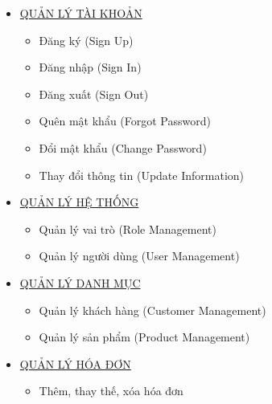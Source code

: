 \begin{itemize}

\item \underline{\textsc{QUẢN LÝ TÀI KHOẢN}}

\begin{itemize}

\item Đăng ký (Sign Up)

\item Đăng nhập (Sign In)

\item Đăng xuất (Sign Out)

\item Quên mật khẩu (Forgot Password)

\item Đổi mật khẩu (Change Password)

\item Thay đổi thông tin (Update Information)

\end{itemize}

\item \underline{\textsc{QUẢN LÝ HỆ THỐNG}}

\begin{itemize}

\item Quản lý vai trò (Role Management)

\item Quản lý người dùng (User Management)

\end{itemize}

\item \underline{\textsc{QUẢN LÝ DANH MỤC}}

\begin{itemize}

\item Quản lý khách hàng (Customer Management)

\item Quản lý sản phẩm (Product Management)

\end{itemize}

\item \underline{\textsc{QUẢN LÝ HÓA ĐƠN}}

\begin{itemize}

\item Thêm, thay thế, xóa hóa đơn

\end{itemize}


\end{itemize}
